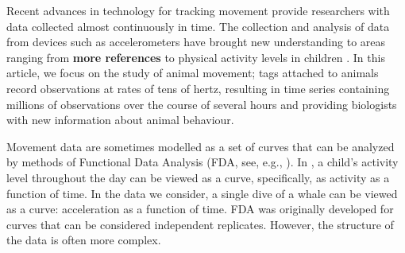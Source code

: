



Recent advances in technology for tracking movement provide researchers with data collected almost continuously in time.
The collection and analysis of data from devices such as accelerometers have brought new understanding to areas ranging from  {\bf{more references}}  to physical activity levels in children \citep{Morris:2007}.
In this article, we focus on the study of animal movement;  tags attached to animals record observations at rates of tens of hertz, resulting in time series containing millions of observations over the course of several hours and providing biologists with new information about  animal behaviour.


Movement data are sometimes modelled as a set of curves that can  be analyzed by methods of Functional Data Analysis (FDA, see, e.g., \citealt{Ramsay:2005}).  In \cite{Morris:2007}, a child's activity level throughout the day can be viewed as a curve, specifically, as activity as a function of time.   
In the data  we consider, a single dive of a whale can be viewed as a curve:  acceleration as a function of time.
FDA was originally developed for curves that can be considered independent replicates.
However, the structure of the data is often more complex.


